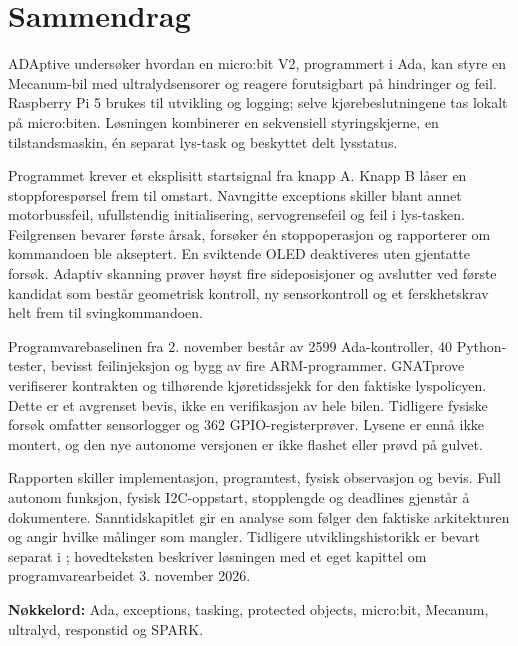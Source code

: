 \hypersetup{pageanchor=true}
\chapter*{Sammendrag}
ADAptive undersøker hvordan en micro:bit V2, programmert i Ada, kan styre en
Mecanum-bil med ultralydsensorer og reagere forutsigbart på hindringer og feil.
Raspberry Pi 5 brukes til utvikling og logging; selve kjørebeslutningene tas
lokalt på micro:biten. Løsningen kombinerer en sekvensiell styringskjerne,
en tilstandsmaskin, én separat lys-task og beskyttet delt lysstatus.

Programmet krever et eksplisitt startsignal fra knapp A. Knapp B låser en
stoppforespørsel frem til omstart. Navngitte exceptions skiller blant annet
motorbussfeil, ufullstendig initialisering, servogrensefeil og feil i lys-tasken.
Feilgrensen bevarer første årsak, forsøker én stoppoperasjon og rapporterer
om kommandoen ble akseptert. En sviktende OLED deaktiveres uten gjentatte
forsøk. Adaptiv skanning prøver høyst fire sideposisjoner og avslutter ved
første kandidat som består geometrisk kontroll, ny sensorkontroll og et
ferskhetskrav helt frem til svingkommandoen.

Programvarebaselinen fra 2. november består av 2599 Ada-kontroller, 40
Python-tester, bevisst feilinjeksjon og bygg av fire ARM-programmer.
GNATprove verifiserer kontrakten og tilhørende kjøretidssjekk for den faktiske
lyspolicyen. Dette er et avgrenset bevis, ikke en verifikasjon av hele bilen.
Tidligere fysiske forsøk omfatter sensorlogger og 362 GPIO-registerprøver.
Lysene er ennå ikke montert, og den nye autonome versjonen er ikke flashet
eller prøvd på gulvet.

Rapporten skiller implementasjon, programtest, fysisk observasjon og bevis.
Full autonom funksjon, fysisk I2C-oppstart, stopplengde og deadlines gjenstår
å dokumentere. Sanntidskapitlet gir en analyse som følger den faktiske
arkitekturen og angir hvilke målinger som mangler. Tidligere
utviklingshistorikk er bevart separat i ;
hovedteksten beskriver løsningen med et eget kapittel om programvarearbeidet
3. november 2026.

\textbf{Nøkkelord:} Ada, exceptions, tasking, protected objects, micro:bit,
Mecanum, ultralyd, responstid og SPARK.
\tableofcontents
\clearpage
{}











\label{last-main-page}
\clearpage
{}
{}


\label{last-reference-page}
\appendix
